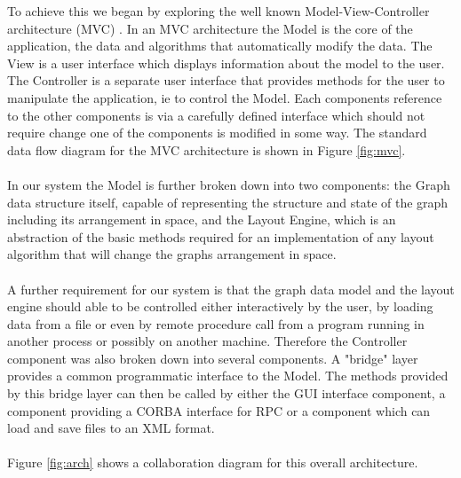 \documentclass[runningheads]{cl2emult}
\begin{document}
To achieve this we began by exploring the well known Model-View-Controller
architecture (MVC) \cite{gamma94design}.  In an MVC architecture the Model is the core
of the application, the data and algorithms that automatically modify
the data.  The View is a user interface which displays information
about the model to the user.  The Controller is a separate user
interface that provides methods for the user to manipulate the
application, ie to control the Model.  Each components reference to
the other components is via a carefully defined interface which should
not require change one of the components is modified in some way.  The
standard data flow diagram for the MVC architecture is shown in Figure
\ref{fig:mvc}.

\paragraph{}

In our system the Model is further broken down into two components:
the Graph data structure itself, capable of representing the structure
and state of the graph including its arrangement in space, and
the Layout Engine, which is an abstraction of the basic methods required for
an implementation of any layout algorithm that will change the graphs
arrangement in space.

\paragraph{}

A further requirement for our system is that the graph data model and
the layout engine should able to be controlled either interactively by
the user, by loading data from a file or even by remote
procedure call from a program running in another process or possibly on
another machine.  Therefore the Controller component was also broken
down into several components.  A "bridge" layer provides a common
programmatic interface to the Model.  The methods provided by this
bridge layer can then be called by either the GUI interface component,
a component providing a CORBA interface for RPC or a component which
can load and save files to an XML format.

\paragraph{}

Figure \ref{fig:arch} shows a collaboration diagram for this overall
architecture. 
\end{document}
